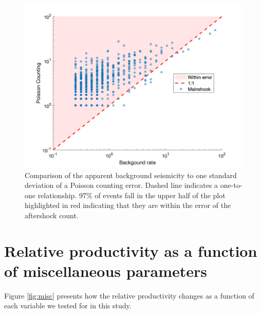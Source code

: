 \documentclass[draft]{agujournal}
\begin{document}
\begin{figure}[H]
\centering
\includegraphics[width=\linewidth]{figures/does_back_matter.png}
\caption{Comparison of the apparent background seismicity to one standard deviation of a Poisson counting error. Dashed line indicates a one-to-one relationship. 97\% of events fall in the upper half of the plot highlighted in red indicating that they are within the error of the aftershock count.}
\label{fig:error_comparasion}
\end{figure}

    
\section{Relative productivity as a function of miscellaneous parameters}\label{sec:relative}

Figure \ref{fig:misc} presents how the relative productivity changes as a function of each variable we tested for in this study. 
\end{document}
